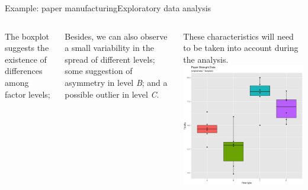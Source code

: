 \begin{frame}{Example: paper manufacturing}{Exploratory data analysis}
  \begin{columns}
    The boxplot suggests the existence of differences among factor levels;
    \bigskip

    Besides, we can also observe a small variability in the spread of different levels; some suggestion of asymmetry in level \textit{B}; and a possible outlier in level \textit{C}.
    \bigskip

    These characteristics will need to be taken into account during the analysis.
    \includegraphics[width=1\textwidth]{../img/paperboxplot.png}
  \end{columns}
\end{frame}


%

